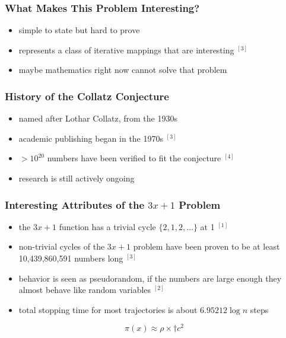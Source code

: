 \documentclass[12pt, a4paper, reqno]{amsart}
\begin{document}
\subsubsection{What Makes This Problem Interesting?}

\begin{itemize}
    \item simple to state but hard to prove
    \item represents a class of iterative mappings that are interesting $^{[3]}$
    \item maybe mathematics right now cannot solve that problem
\end{itemize}

\subsubsection{History of the Collatz Conjecture}

\begin{itemize}
    \item named after Lothar Collatz, from the 1930s
    \item academic publishing began in the 1970s $^{[3]}$
    \item $>10^{20}$ numbers have been verified to fit the conjecture $^{[4]}$
    \item research is still actively ongoing
\end{itemize}

\subsubsection{Interesting Attributes of the $3x+1$ Problem}

\begin{itemize}
    \item the $3x+1$ function has a trivial cycle $\{2,1,2,\dots\}$ at 1 $^{[1]}$
    \item non-trivial cycles of the $3x+1$ problem have been proven to
        be at least 10,439,860,591 numbers long $^{[3]}$
    \item behavior is seen as pseudorandom, if the numbers are large enough they almost
        behave like random variables $^{[2]}$
    \item total stopping time for most trajectories is about $6.95212 \log n$ steps
\end{itemize}


\begin{equation}
    \pi(x) \approx \rho \times \dagger c^2
\end{equation}
\end{document}
